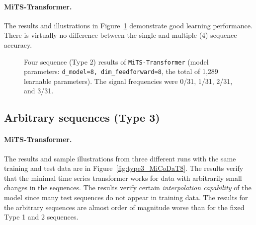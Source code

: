 \documentclass[final]{article}
\begin{document}
\paragraph{MiTS-Transformer.} The results and illustrations in Figure~\ref{fig:type2_MiCoDaT} demonstrate good learning performance. There is virtually no difference between the single and multiple (4) sequence accuracy.

\begin{figure}[h]
  \caption{Four sequence (Type 2) results of \texttt{MiTS-Transformer} (model parameters: \texttt{d\_model=8, dim\_feedforward=8}, the total of 1,289 learnable parameters). The signal frequencies were 0/31, 1/31, 2/31, and 3/31.\label{fig:type2_MiCoDaT}}
\end{figure}

%
%
\subsection{Arbitrary sequences (Type 3)}

\paragraph{MiTS-Transformer.} The results and sample illustrations from three different runs with the same training and test data are in Figure~\ref{fig:type3_MiCoDaT8}. The results verify that the minimal time series transformer works for data with arbitrarily small changes in the sequences. The results verify certain \textit{interpolation capability} of the model since many test sequences do not appear in training data. The results for the arbitrary sequences are almost order of magnitude worse than for the fixed Type 1 and 2 sequences.
\end{document}
